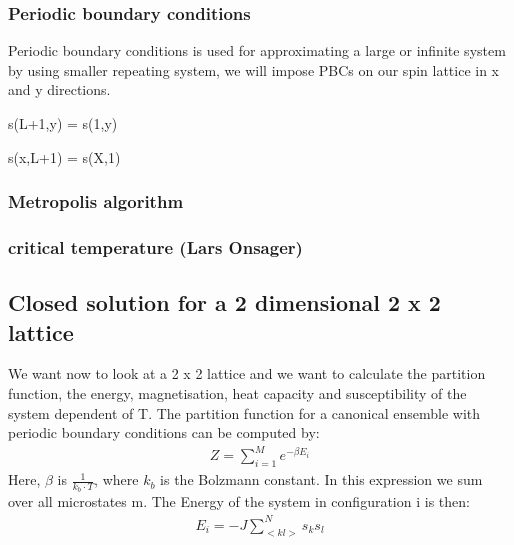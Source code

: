 \documentclass[10pt,a4paper]{article}
\begin{document}
  
  \subsubsection{Periodic boundary conditions} 
Periodic boundary conditions is used for approximating a large or infinite system by using smaller repeating system, we will impose PBCs on our spin lattice in x and y directions.

 s(L+1,y) = s(1,y)
 
 s(x,L+1) = s(X,1)  

\subsubsection{Metropolis algorithm}
\subsubsection{critical temperature (Lars Onsager)}
\subsection{Closed solution for a 2 dimensional 2 x 2 lattice}

We want now to look at a 2 x 2 lattice and we want to calculate the partition function, the energy, magnetisation, heat capacity and susceptibility of the system  dependent of T. 
The partition function for a canonical ensemble with periodic boundary conditions can be computed  by:
\begin{align}
Z= \sum_{i=1}^{M} e^{- \beta E_i}
\end{align} 
Here, $\beta$ is $\frac{1}{k_b \cdot T}$, where $k_b$ is the Bolzmann constant. 
In this expression we sum over all microstates m. The Energy of the system in configuration i is then:
\begin{align}
E_i = - J \sum_{<kl>}^N s_k s_l 
\end{align} 
\end{document}
